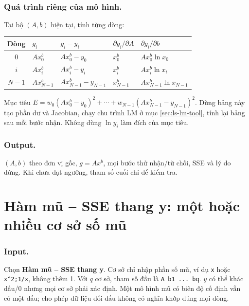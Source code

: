 \subsubsection*{Quá trình riêng của mô hình.} Tại bộ $(A,b)$ hiện tại, tính từng dòng:
\begin{center}\small\begin{tabular}{cllll}\toprule
Dòng&$g_i$&$g_i-y_i$&$\partial g_i/\partial A$&$\partial g_i/\partial b$\\\midrule
0&$Ax_0^b$&$Ax_0^b-y_0$&$x_0^b$&$Ax_0^b\ln x_0$\\
$i$&$Ax_i^b$&$Ax_i^b-y_i$&$x_i^b$&$Ax_i^b\ln x_i$\\
$N-1$&$Ax_{N-1}^b$&$Ax_{N-1}^b-y_{N-1}$&$x_{N-1}^b$&$Ax_{N-1}^b\ln x_{N-1}$\\\bottomrule
\end{tabular}\end{center}
Mục tiêu $E=w_0(Ax_0^b-y_0)^2+\cdots+w_{N-1}(Ax_{N-1}^b-y_{N-1})^2$. Dùng bảng này tạo phần dư và Jacobian, chạy chu trình LM ở mục \ref{sec:ls-lm-tool}, tính lại bảng sau mỗi bước nhận. Không dùng $\ln y_i$ làm đích của mục tiêu.
\subsubsection*{Output.} $(A,b)$ theo đơn vị gốc, $g=Ax^b$, mọi bước thử nhận/từ chối, SSE và lý do dừng. Khi chưa đạt ngưỡng, tham số cuối chỉ để kiểm tra.

\examplebreak
\section{Hàm mũ -- SSE thang y: một hoặc nhiều cơ sở số mũ}
\label{sec:ls-exp-raw}
\subsubsection*{Input.} Chọn \textbf{Hàm mũ -- SSE thang y}. Cơ sở chỉ nhập phần số mũ, ví dụ \texttt{x} hoặc \texttt{x\^{}2;1/x}, không thêm 1. Với $q$ cơ sở, tham số đầu là \texttt{A b1 ... bq}. $y$ có thể khác dấu/0 nhưng mọi cơ sở phải xác định. Một mô hình mũ có biên độ cố định vẫn có một dấu; cho phép dữ liệu đổi dấu không có nghĩa khớp đúng mọi dòng.
